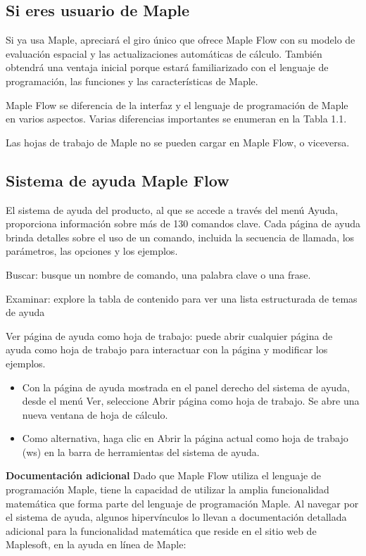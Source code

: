 \subsection{Si eres usuario de Maple}
Si ya usa Maple, apreciará el giro único que ofrece Maple Flow con su modelo de evaluación espacial y las actualizaciones automáticas de cálculo. También obtendrá una ventaja inicial porque estará familiarizado con el lenguaje de programación, las funciones y las características de Maple.

Maple Flow se diferencia de la interfaz y el lenguaje de programación de Maple en varios aspectos. Varias diferencias importantes se enumeran en la Tabla 1.1.


Las hojas de trabajo de Maple no se pueden cargar en Maple Flow, o viceversa.

\subsection{Sistema de ayuda Maple Flow}
El sistema de ayuda del producto, al que se accede a través del menú Ayuda, proporciona información sobre más de 130 comandos clave. Cada página de ayuda brinda detalles sobre el uso de un comando, incluida la secuencia de llamada, los parámetros, las opciones y los ejemplos.

Buscar: busque un nombre de comando, una palabra clave o una frase.

Examinar: explore la tabla de contenido para ver una lista estructurada de temas de ayuda

Ver página de ayuda como hoja de trabajo: puede abrir cualquier página de ayuda como hoja de trabajo para interactuar con la página y modificar los ejemplos.

\begin{itemize}
  \item Con la página de ayuda mostrada en el panel derecho del sistema de ayuda, desde el menú Ver, seleccione Abrir página como hoja de trabajo. Se abre una nueva ventana de hoja de cálculo. 
  \item Como alternativa, haga clic en Abrir la página actual como hoja de trabajo (ws) en la barra de herramientas del sistema de ayuda.
\end{itemize}

\textbf{Documentación adicional}
Dado que Maple Flow utiliza el lenguaje de programación Maple, tiene la capacidad de utilizar la amplia funcionalidad matemática que forma parte del lenguaje de programación Maple. Al navegar por el sistema de ayuda, algunos hipervínculos lo llevan a documentación detallada adicional para la funcionalidad matemática que reside en el sitio web de Maplesoft, en la ayuda en línea de Maple:


